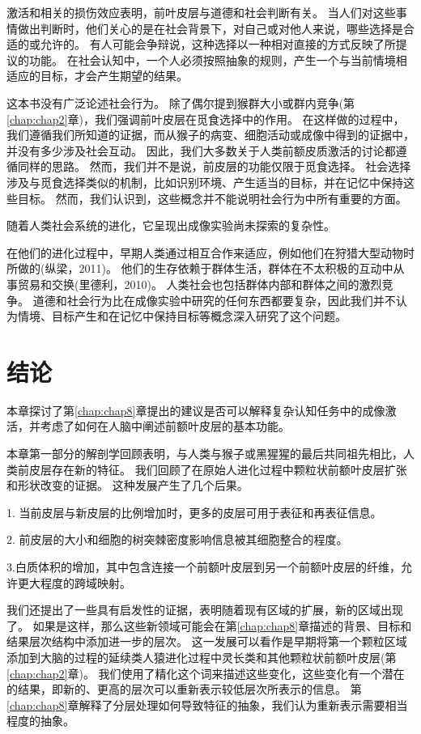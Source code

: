 激活和相关的损伤效应表明，前叶皮层与道德和社会判断有关。
当人们对这些事情做出判断时，他们关心的是在社会背景下，对自己或对他人来说，哪些选择是合适的或允许的。
有人可能会争辩说，这种选择以一种相对直接的方式反映了所提议的功能。
在社会认知中，一个人必须按照抽象的规则，产生一个与当前情境相适应的目标，才会产生期望的结果。


这本书没有广泛论述社会行为。
除了偶尔提到猴群大小或群内竞争(第\ref{chap:chap2}章)，我们强调前叶皮层在觅食选择中的作用。
在这样做的过程中，我们遵循我们所知道的证据，而从猴子的病变、细胞活动或成像中得到的证据中，并没有多少涉及社会互动。
因此，我们大多数关于人类前额皮质激活的讨论都遵循同样的思路。
然而，我们并不是说，前皮层的功能仅限于觅食选择。
社会选择涉及与觅食选择类似的机制，比如识别环境、产生适当的目标，并在记忆中保持这些目标。
然而，我们认识到，这些概念并不能说明社会行为中所有重要的方面。


随着人类社会系统的进化，它呈现出成像实验尚未探索的复杂性。


在他们的进化过程中，早期人类通过相互合作来适应，例如他们在狩猎大型动物时所做的(纵梁，2011)。
他们的生存依赖于群体生活，群体在不太积极的互动中从事贸易和交换(里德利，2010)。
人类社会也包括群体内部和群体之间的激烈竞争。
道德和社会行为比在成像实验中研究的任何东西都要复杂，因此我们并不认为情境、目标产生和在记忆中保持目标等概念深入研究了这个问题。



\section{结论}

本章探讨了第\ref{chap:chap8}章提出的建议是否可以解释复杂认知任务中的成像激活，并考虑了如何在人脑中阐述前额叶皮层的基本功能。


本章第一部分的解剖学回顾表明，与人类与猴子或黑猩猩的最后共同祖先相比，人类前皮层存在新的特征。
我们回顾了在原始人进化过程中颗粒状前额叶皮层扩张和形状改变的证据。
这种发展产生了几个后果。


1. 当前皮层与新皮层的比例增加时，更多的皮层可用于表征和再表征信息。


2. 前皮层的大小和细胞的树突棘密度影响信息被其细胞整合的程度。


3.白质体积的增加，其中包含连接一个前额叶皮层到另一个前额叶皮层的纤维，允许更大程度的跨域映射。


我们还提出了一些具有启发性的证据，表明随着现有区域的扩展，新的区域出现了。
如果是这样，那么这些新领域可能会在第\ref{chap:chap8}章描述的背景、目标和结果层次结构中添加进一步的层次。
这一发展可以看作是早期将第一个颗粒区域添加到大脑的过程的延续类人猿进化过程中灵长类和其他颗粒状前额叶皮层(第\ref{chap:chap2}章)。
我们使用了精化这个词来描述这些变化，这些变化有一个潜在的结果，即新的、更高的层次可以重新表示较低层次所表示的信息。
第\ref{chap:chap8}章解释了分层处理如何导致特征的抽象，我们认为重新表示需要相当程度的抽象。


